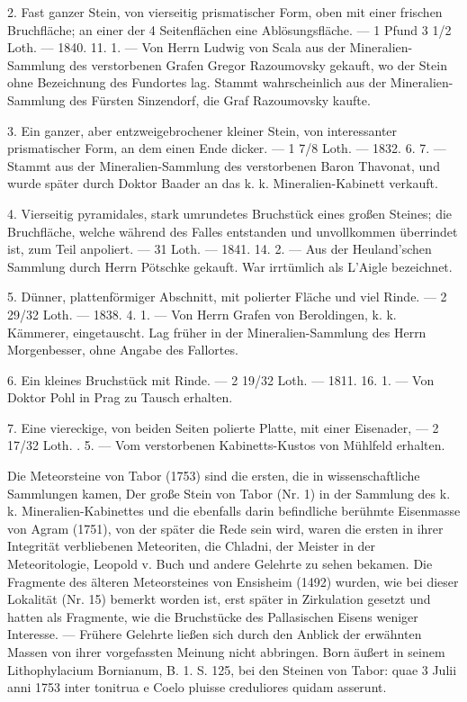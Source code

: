 \documentclass[a4paper, 11pt, oneside, polutonikogreek, german]{article}
\begin{document}
2. Fast ganzer Stein, von vierseitig prismatischer Form, oben mit einer frischen Bruchfläche; an einer der 4 Seitenflächen eine Ablösungsfläche. — 1 Pfund 3 1/2 Loth. — 1840. 11. 1. — Von Herrn Ludwig von Scala aus der Mineralien-Sammlung des verstorbenen Grafen Gregor Razoumovsky gekauft, wo der Stein ohne Bezeichnung des Fundortes lag. Stammt wahrscheinlich aus der Mineralien-Sammlung des Fürsten Sinzendorf, die Graf Razoumovsky kaufte.

3. Ein ganzer, aber entzweigebrochener kleiner Stein, von interessanter prismatischer Form, an dem einen Ende dicker. — 1 7/8 Loth. — 1832. 6. 7. — Stammt aus der Mineralien-Sammlung des verstorbenen Baron Thavonat, und wurde später durch Doktor Baader an das k. k. Mineralien-Kabinett verkauft.

4. Vierseitig pyramidales, stark umrundetes Bruchstück eines großen Steines; die Bruchfläche, welche während des Falles entstanden und unvollkommen überrindet ist, zum Teil anpoliert. — 31 Loth. — 1841. 14. 2. — Aus der Heuland'schen Sammlung durch Herrn Pötschke gekauft. War irrtümlich als L'Aigle bezeichnet.

5. Dünner, plattenförmiger Abschnitt, mit polierter Fläche und viel Rinde. — 2 29/32 Loth. — 1838. 4. 1. — Von Herrn Grafen von Beroldingen, k. k. Kämmerer, eingetauscht. Lag früher in der Mineralien-Sammlung des Herrn Morgenbesser, ohne Angabe des Fallortes.

6. Ein kleines Bruchstück mit Rinde. — 2 19/32 Loth. — 1811. 16. 1. — Von Doktor Pohl in Prag zu Tausch erhalten.

7. Eine viereckige, von beiden Seiten polierte Platte, mit einer Eisenader, — 2 17/32 Loth. . 5. — Vom verstorbenen Kabinetts-Kustos von Mühlfeld erhalten.

Die Meteorsteine von Tabor (1753) sind die ersten, die in wissenschaftliche Sammlungen kamen, Der große Stein von Tabor (Nr. 1) in der Sammlung des k. k. Mineralien-Kabinettes und die ebenfalls darin befindliche berühmte Eisenmasse von Agram (1751), von der später die Rede sein wird, waren die ersten in ihrer Integrität verbliebenen Meteoriten, die Chladni, der Meister in der Meteoritologie, Leopold v. Buch und andere Gelehrte zu sehen bekamen. Die Fragmente des älteren Meteorsteines von Ensisheim (1492) wurden, wie bei dieser Lokalität (Nr. 15) bemerkt worden ist, erst später in Zirkulation gesetzt und hatten als Fragmente, wie die Bruchstücke des Pallasischen Eisens weniger Interesse. — Frühere Gelehrte ließen sich durch den Anblick der erwähnten Massen von ihrer vorgefassten Meinung nicht abbringen. Born äußert in seinem Lithophylacium Bornianum, B. 1. S. 125, bei den Steinen von Tabor: quae 3 Julii anni 1753 inter tonitrua e Coelo pluisse creduliores quidam asserunt.
\end{document}

